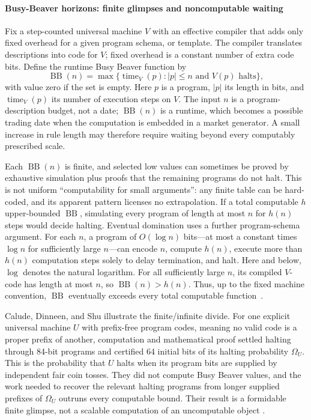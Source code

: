 \documentclass[aps,pra,reprint,superscriptaddress,amsmath,amssymb,floatfix]{revtex4-2}
\theoremstyle{plain}
\theoremstyle{definition}
\theoremstyle{remark}
\begin{document}
\paragraph{Busy-Beaver horizons: finite glimpses and noncomputable waiting}

Fix a step-counted universal machine \(V\) with an effective compiler that adds
only fixed overhead for a given program schema, or template. The compiler
translates descriptions into code for \(V\); fixed overhead is a constant
number of extra code bits. Define the runtime Busy Beaver function by
\begin{equation}
  \operatorname{BB}(n)
  =
  \max\{\operatorname{time}_V(p):
  |p|\leq n\text{ and }V(p)\text{ halts}\},
  \label{eq:busybeaver}
\end{equation}
with value zero if the set is empty. Here \(p\) is a program, \(|p|\) its
length in bits, and \(\operatorname{time}_V(p)\) its number of execution steps
on \(V\). The input \(n\) is a program-description budget, not a date; \(\operatorname{BB}(n)\) is a runtime, which becomes a
possible trading date when the computation is embedded in a market generator.
A small increase in rule length may therefore require waiting beyond every
computably prescribed scale.

Each \(\operatorname{BB}(n)\) is finite, and selected low values can sometimes
be proved by exhaustive simulation plus proofs that the remaining programs do
not halt. This is not uniform ``computability for small arguments'': any finite
table can be hard-coded, and its apparent pattern licenses no extrapolation. If
a total computable \(h\) upper-bounded \(\operatorname{BB}\), simulating every
program of length at most \(n\) for \(h(n)\) steps would decide halting.
Eventual domination uses a further program-schema argument. For each \(n\), a
program of \(O(\log n)\) bits---at most a constant times \(\log n\) for
sufficiently large \(n\)---can encode \(n\), compute \(h(n)\), execute more
than \(h(n)\) computation steps solely to delay termination, and halt.
Here and below, \(\log\) denotes the natural logarithm. For all sufficiently large \(n\), its
compiled \(V\)-code has length at most \(n\), so
\(\operatorname{BB}(n)>h(n)\). Thus, up to the fixed machine convention,
\(\operatorname{BB}\) eventually exceeds every total computable
function~\cite{rado,chaitin-bb}.

Calude, Dinneen, and Shu illustrate the finite/infinite divide. For one explicit
universal machine \(U\) with prefix-free program codes, meaning no valid code
is a proper prefix of another, computation and mathematical proof settled
halting through 84-bit programs and certified 64 initial bits of its halting
probability \(\Omega_U\). This is the probability that \(U\) halts when its
program bits are supplied by independent fair coin tosses. They did not compute Busy Beaver values, and
the work needed to recover the relevant halting programs from longer supplied
prefixes of \(\Omega_U\) outruns every computable bound. Their result is a
formidable finite glimpse, not a scalable computation of an uncomputable object
\cite{2002-glimpseofran}.
\end{document}
